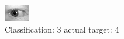 \begin{figure}[h!]
\begin{center}
\includegraphics[width=0.60\columnwidth]{figures/ID766_class_3_target_4.png}
\end{center}
\caption{ Classification: 3 actual target: 4}
\label{fig:ID766_class_3_target_4}
\end{figure}

